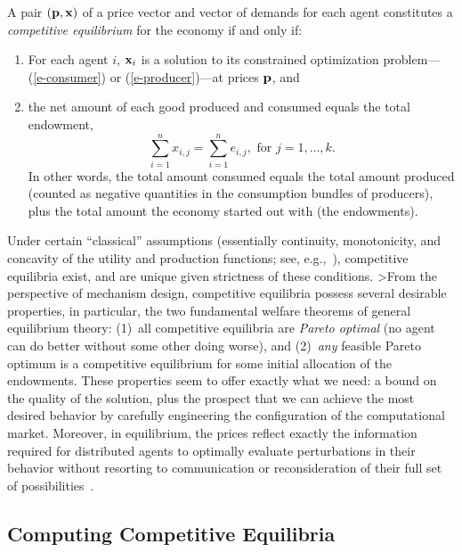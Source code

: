 A pair $({\bf p},{\bf x})$ of a price vector and vector of demands for 
each agent constitutes a {\em competitive equilibrium\/} for the economy 
if and only if:
\begin{enumerate}
	\item  For each agent $i$, ${\bf x}_i$ is a solution to its constrained 
	optimization problem---(\ref{e-consumer}) or (\ref{e-producer})---at
	prices $\bf p$, and
	\item  the net amount of each good produced and consumed equals the total
	endowment,
	\begin{equation}\label{e-balance}
		\sum_{i=1}^n x_{i,j} = \sum_{i=1}^n e_{i,j},\mbox{ for }j=1,\ldots,k.
	\end{equation}
	In other words, the total amount consumed equals the total amount 
	produced (counted as negative quantities in the consumption 
	bundles of producers), plus the total amount the economy started out with 
	(the endowments).
\end{enumerate}

Under certain ``classical'' assumptions (essentially continuity, 
monotonicity, and concavity of the utility and production functions; see, 
e.g.,~\cite{Hildenbrand76,Varian84}), competitive equilibria exist, and are 
unique given strictness of these conditions. 
>From the perspective of mechanism design, competitive equilibria possess
several desirable properties, in particular, the two fundamental welfare theorems of general 
equilibrium theory: (1)~all competitive equilibria are {\em Pareto 
optimal\/} (no agent can do better without some other doing worse), and 
(2)~{\em any\/} feasible Pareto optimum is a competitive equilibrium for 
some initial allocation of the endowments.
These properties seem to offer exactly what we need: a bound on the quality
of the solution, plus the 
prospect that we can achieve the most desired behavior by carefully
engineering the configuration of the computational market.  
Moreover, in equilibrium, the prices reflect exactly the information 
required for distributed agents to optimally evaluate perturbations in 
their behavior without resorting to communication or reconsideration of 
their full set of possibilities~\cite{Koopmans}.

\subsection{Computing Competitive Equilibria}

